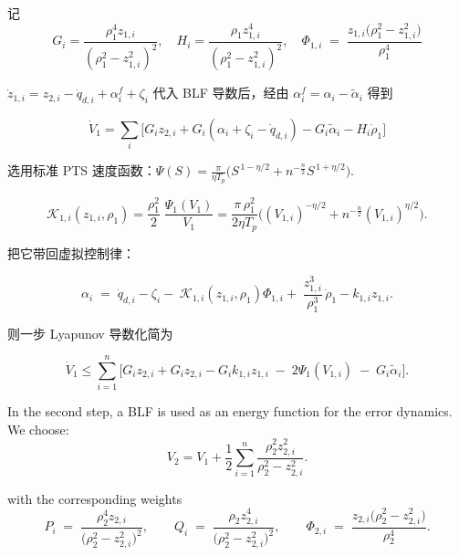 \documentclass[pdflatex,sn-mathphys-num]{sn-jnl}%
\theoremstyle{thmstyleone}%
\theoremstyle{thmstyletwo}%
\theoremstyle{thmstylethree}%
\begin{document}
记
$$

G_i=\frac{\rho_{1}^4 z_{1,i}}{(\rho_{1}^2-z_{1,i}^2)^2},\quad
H_i=\frac{\rho_{1} z_{1,i}^4}{(\rho_{1}^2-z_{1,i}^2)^2},
\quad
\Phi_{1,i}\;=\;\frac{z_{1,i}\bigl(\rho_{1}^{2}-z_{1,i}^{2}\bigr)}{\rho_{1}^{4}}
$$

$\dot z_{1,i}= z_{2,i}-\dot q_{d,i}+\alpha^{f}_i+\zeta_i$ 代入 BLF 导数后，经由
$\alpha^{f}_i=\alpha_i-\tilde\alpha_i$ 得到

$$
\dot V_1=\sum_i\!\Big[G_i z_{2,i}+G_i(\alpha_i+\zeta_i-\dot q_{d,i})-G_i\tilde\alpha_i-H_i\dot\rho_{1}\Big]
$$

选用标准 PTS 速度函数：$
\Psi(S)=\frac{\pi}{ \eta T_p}\Big(S^{\,1-\eta/2}+n^{-\frac{n}{2} }S^{\,1+\eta/2}\Big).
$

$$
\mathcal{K}_{1,i}(z_{1,i},\rho_{1})
=\frac{\rho_{1}^2}{2}\;\frac{\Psi_1(V_1)}{V_1}
=\frac{\pi\,\rho_{1}^2}{2\eta T_p}\Big((V_{1,i})^{-\eta/2}+n^{-\frac{n}{2} }(V_{1,i})^{\eta/2}\Big).
$$

把它带回虚拟控制律：

$$
\alpha_i \;=\; \dot q_{d,i}-\zeta_i
-\;\mathcal{K}_{1,i}(z_{1,i},\rho_{1})\Phi_{1,i}
+\;\frac{z_{1,i}^3}{\rho_{1}^3}\,\dot\rho_{1}-k_{1,i}z_{1,i}.
$$

则一步 Lyapunov 导数化简为

$$
\dot V_1
\le \sum_{i=1}^n \Big[ G_i z_{2,i}+G_i z_{2,i}
-G_i k_{1,i}z_{1,i}\;-\;2\Psi_1(V_{1,i})\;-\;G_i\tilde\alpha_i
\Big].
$$


In the second step, a BLF is used as an energy function for the error dynamics. We choose:
\begin{equation}\label{eq:25}
	V_2= V_1+\frac{1}{2}\sum_{i=1}^{n} \frac{\rho_{2}^2 z_{2,i}^2}{\rho_{2}^2-z_{2,i}^2}. 
\end{equation}


with the corresponding weights
\[
P_i \;=\; \frac{\rho_{2}^4 z_{2,i}}{\bigl(\rho_{2}^{2}-z_{2,i}^{2}\bigr)^{2}},\qquad
Q_{i}\;=\;\frac{\rho_{2} z_{2,i}^{4}}{\bigl(\rho_{2}^{2}-z_{2,i}^{2}\bigr)^{2}},\qquad
\Phi_{2,i}\;=\;\frac{z_{2,i}\bigl(\rho_{2}^{2}-z_{2,i}^{2}\bigr)}{\rho_{2}^{4}} .
\]


\end{document}
